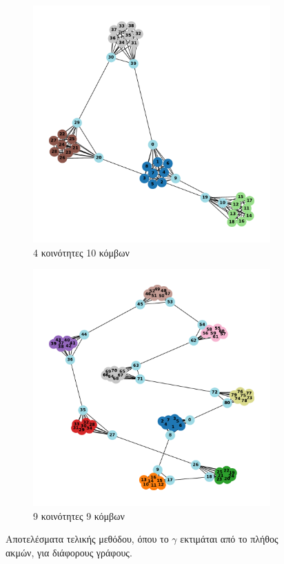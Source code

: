 \documentclass[12pt, letterpaper]{article}
\begin{document}
\begin{figure}
  \vfill

  \begin{subfigure}{0.5\textwidth}
    \centering
    \includegraphics[width=0.6\linewidth]{AUTO4,10.pdf}
    \caption{4 κοινότητες 10 κόμβων}
    \label{}
  \end{subfigure}
  \begin{subfigure}{0.5\textwidth}
    \centering
    \includegraphics[width=0.6\linewidth]{AUTO9,9.pdf}
    \caption{9 κοινότητες 9 κόμβων}
    \label{}
  \end{subfigure}


  \caption{Αποτελέσματα τελικής μεθόδου, όπου το $\gamma$ εκτιμάται 
  από το πλήθος ακμών, για διάφορους γράφους.}
  \label{edgeresults}
\end{figure}
\end{document}
